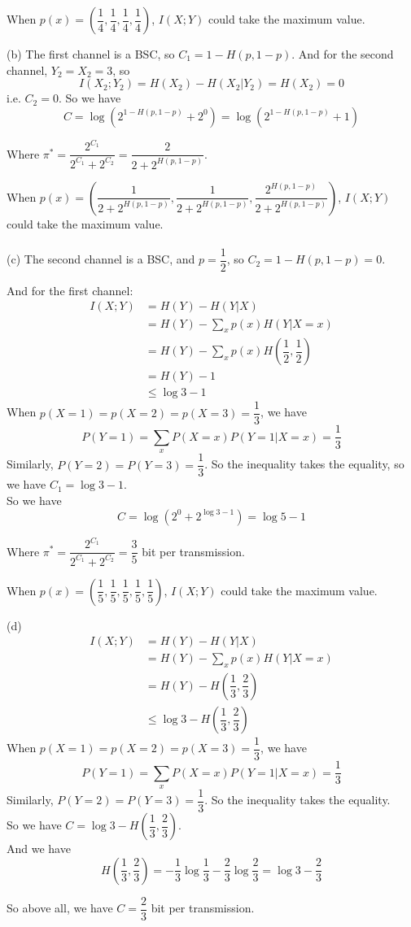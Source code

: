 When $p(x)=\left(\dfrac{1}{4},\dfrac{1}{4},\dfrac{1}{4},\dfrac{1}{4}\right)$, $I(X;Y)$ could take the maximum value.

(b) The first channel is a BSC, so $C_1=1-H(p,1-p)$. And for the second channel, $Y_2=X_2=3$, so
$$I(X_2;Y_2)=H(X_2)-H(X_2|Y_2)=H(X_2)=0$$
i.e. $C_2=0$. So we have
$$C=\log\left(2^{1-H(p,1-p)}+2^0\right)=\log\left(2^{1-H(p,1-p)}+1\right)$$

Where $\pi^*=\dfrac{2^{C_1}}{2^{C_1}+2^{C_2}}=\dfrac{2}{2+2^{H\left(p,1-p\right)}}$.

When $p(x)=\left(\dfrac{1}{2+2^{H\left(p,1-p\right)}},\dfrac{1}{2+2^{H\left(p,1-p\right)}},\dfrac{2^{H\left(p,1-p\right)}}{2+2^{H\left(p,1-p\right)}}\right)$, $I(X;Y)$ could take the maximum value. \\\\


(c) The second channel is a BSC, and $p=\dfrac{1}{2}$, so $C_2=1-H(p,1-p)=0$.

And for the first channel:
\begin{align*}
I(X;Y) &= H(Y) - H(Y|X) \\
&= H(Y) - \sum_{x}p(x)H(Y|X=x) \\
&= H(Y) - \sum_{x}p(x)H\left(\dfrac{1}{2},\dfrac{1}{2}\right) \\
&= H(Y) - 1 \\
&\leq \log 3 - 1
\end{align*}
When $p(X=1)=p(X=2)=p(X=3)=\dfrac{1}{3}$, we have
$$P(Y=1)=\sum_xP(X=x)P(Y=1|X=x)=\dfrac{1}{3}$$
Similarly, $P(Y=2)=P(Y=3)=\dfrac{1}{3}$. So the inequality takes the equality, so we have $C_1=\log 3 - 1$. \\
So we have
$$C=\log\left(2^0+2^{\log 3-1}\right)=\log 5 - 1$$

Where $\pi^*=\dfrac{2^{C_1}}{2^{C_1}+2^{C_2}}=\dfrac{3}{5}$ bit per transmission.

When $p(x)=\left(\dfrac{1}{5},\dfrac{1}{5},\dfrac{1}{5},\dfrac{1}{5},\dfrac{1}{5}\right)$, $I(X;Y)$ could take the maximum value.

(d)
\begin{align*}
I(X;Y) &= H(Y) - H(Y|X) \\
&= H(Y) - \sum_{x}p(x)H(Y|X=x) \\
&= H(Y) - H\left(\dfrac{1}{3},\dfrac{2}{3}\right) \\
&\leq \log 3 - H\left(\dfrac{1}{3},\dfrac{2}{3}\right)
\end{align*}
When $p(X=1)=p(X=2)=p(X=3)=\dfrac{1}{3}$, we have
$$P(Y=1)=\sum_xP(X=x)P(Y=1|X=x)=\dfrac{1}{3}$$
Similarly, $P(Y=2)=P(Y=3)=\dfrac{1}{3}$. So the inequality takes the equality. \\
So we have $C=\log 3 - H\left(\dfrac{1}{3},\dfrac{2}{3}\right)$. \\
And we have
$$H\left(\dfrac{1}{3},\dfrac{2}{3}\right) = -\dfrac{1}{3}\log\dfrac{1}{3}-\dfrac{2}{3}\log\dfrac{2}{3} = \log 3 - \dfrac{2}{3}$$

So above all, we have $C=\dfrac{2}{3}$ bit per transmission.

\newpage